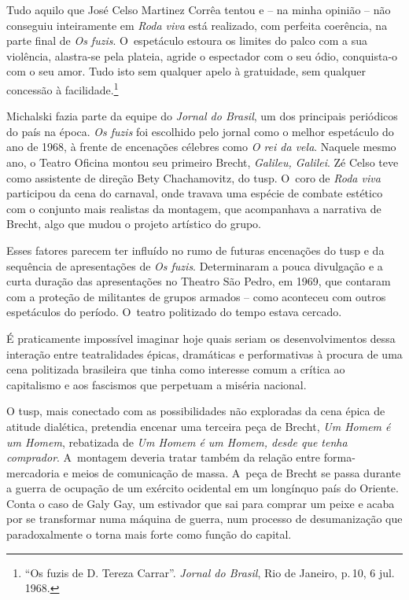 \startblockquote
Tudo aquilo que José Celso Martinez Corrêa tentou e -- na minha opinião
-- não conseguiu inteiramente em {\it Roda viva} está realizado, com
perfeita coerência, na parte final de {\it Os fuzis}. O~espetáculo
estoura os limites do palco com a sua violência, alastra-se pela
plateia, agride o espectador com o seu ódio, conquista-o com o seu amor.
Tudo isto sem qualquer apelo à gratuidade, sem qualquer concessão à
facilidade.\footnote{“Os fuzis de D. Tereza Carrar”. {\it Jornal do
  Brasil}, Rio de Janeiro, p.\,10, 6 jul. 1968.}
\stopblockquote


Michalski fazia parte da equipe do {\it Jornal do Brasil}, um dos
principais periódicos do país na época. {\it Os fuzis} foi escolhido
pelo jornal como o melhor espetáculo do ano de 1968, à frente de
encenações célebres como {\it O rei da vela}. Naquele mesmo ano, o
Teatro Oficina montou seu primeiro Brecht, {\it Galileu, Galilei}. Zé
Celso teve como assistente de direção Bety Chachamovitz, do {\sc tusp}. O~coro
de {\it Roda viva} participou da cena do carnaval, onde travava uma
espécie de combate estético com o conjunto mais realistas da montagem,
que acompanhava a narrativa de Brecht, algo que mudou o projeto
artístico do grupo.

Esses fatores parecem ter influído no rumo de futuras encenações do {\sc tusp}
e da sequência de apresentações de {\it Os fuzis}. Determinaram a pouca
divulgação e a curta duração das apresentações no Theatro São Pedro, em
1969, que contaram com a proteção de militantes de grupos armados -- como
aconteceu com outros espetáculos do período. O~teatro politizado do
tempo estava cercado.

É praticamente impossível imaginar hoje quais seriam os desenvolvimentos
dessa interação entre teatralidades épicas, dramáticas e performativas à
procura de uma cena politizada brasileira que tinha como interesse comum
a crítica ao capitalismo e aos fascismos que perpetuam a miséria
nacional.

O {\sc tusp}, mais conectado com as possibilidades não exploradas da cena
épica de atitude dialética, pretendia encenar uma terceira peça de
Brecht, {\it Um Homem é um Homem}, rebatizada de {\it Um Homem é um
Homem, desde que tenha comprador}. A~montagem deveria tratar também da
relação entre forma-mercadoria e meios de comunicação de massa. A~peça
de Brecht se passa durante a guerra de ocupação de um exército ocidental
em um longínquo país do Oriente. Conta o caso de Galy Gay, um estivador
que sai para comprar um peixe e acaba por se transformar numa máquina de
guerra, num processo de desumanização que paradoxalmente o torna mais
forte como função do capital.

